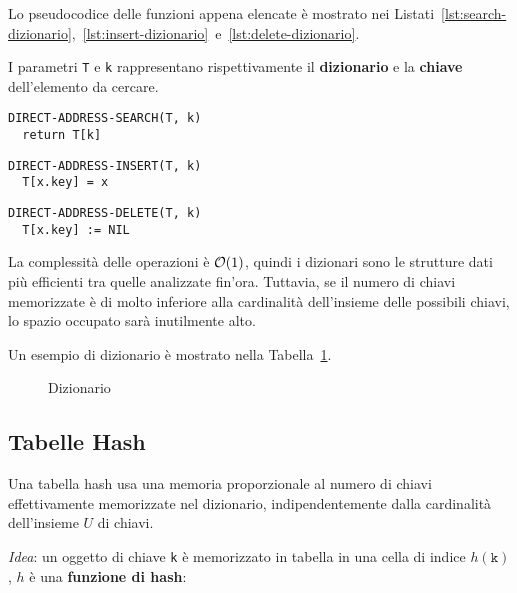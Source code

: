 \documentclass[italian, 10pt]{article}
\begin{document}
\bigskip
Lo pseudocodice delle funzioni appena elencate è mostrato nei Listati~\ref{lst:search-dizionario},~\ref{lst:insert-dizionario}~e~\ref{lst:delete-dizionario}.

I parametri \texttt{T} e \texttt{k} rappresentano rispettivamente il \textbf{dizionario} e la \textbf{chiave} dell'elemento da cercare.

\begin{lstlisting}[style=pseudocode, caption={Ricerca}, label={lst:search-dizionario}]
DIRECT-ADDRESS-SEARCH(T, k)
  return T[k]
  \end{lstlisting}

\begin{lstlisting}[style=pseudocode, caption={Inserzione}, label={lst:insert-dizionario}]
DIRECT-ADDRESS-INSERT(T, k)
  T[x.key] = x
  \end{lstlisting}

\begin{lstlisting}[style=pseudocode, caption={Cancellazione}, label={lst:delete-dizionario}]
DIRECT-ADDRESS-DELETE(T, k)
  T[x.key] := NIL
  \end{lstlisting}

La complessità delle operazioni è \(\mathcal{O}(1)\), quindi i dizionari sono le strutture dati più efficienti tra quelle analizzate fin'ora.
Tuttavia, se il numero di chiavi memorizzate è di molto inferiore alla cardinalità dell'insieme delle possibili chiavi, lo spazio occupato sarà inutilmente alto.

\bigskip
Un esempio di dizionario è mostrato nella Tabella~\ref{fig:dizionario}.

\begin{figure}[htbp]
  \bigskip
  \centering
  \caption{Dizionario}
  \label{fig:dizionario}
  \bigskip
\end{figure}

\subsection{Tabelle Hash}

Una tabella hash usa una memoria proporzionale al numero di chiavi effettivamente memorizzate nel dizionario, indipendentemente dalla cardinalità dell'insieme \(U\) di chiavi.

\textit{Idea}: un oggetto di chiave \texttt{k} è memorizzato in tabella in una cella di indice \(h(\texttt{k})\), \(h\) è una \textbf{funzione di hash}:
\end{document}
